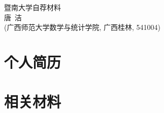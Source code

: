 \documentclass[UFT8]{ctexart}%
\begin{document}
\thispagestyle{empty} %
\vspace*{3cm}
\begin{center}
{{\LARGE\heiti 暨南大学自荐材料}\\[0.6cm]
{\normalsize 唐\ 洁}\\[0.1cm]
{\small(广西师范大学数学与统计学院, 广西桂林, 541004)}}
\end{center}

\clearpage%
\tableofcontents%
\thispagestyle{empty} %

\clearpage%
\setcounter{page}{1}%

%
%
%
%
%
%
%
%


\section{个人简历}


\section{相关材料}
\end{document}
